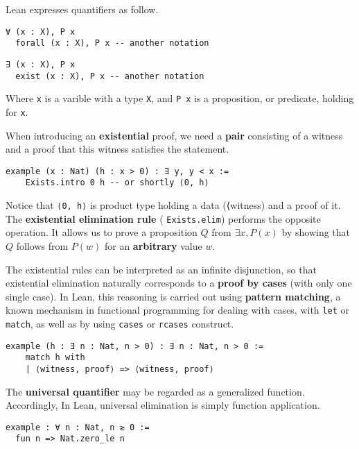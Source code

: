 \begin{example}
  Lean expresses quantifiers as follow.
  \begin{lstlisting}[language=lean, caption=For All]
  ∀ (x : X), P x
  forall (x : X), P x -- another notation
  \end{lstlisting}
  \begin{lstlisting}[language=lean, caption=Exists]
  ∃ (x : X), P x
  exist (x : X), P x -- another notation
  \end{lstlisting}
  Where \lstinline[language=lean]|x| is a varible with a type \lstinline[language=lean]|X|,
  and \lstinline[language=lean]|P x| is a proposition, or predicate, holding for \lstinline[language=lean]|x|.
\end{example}

\begin{example}
  When introducing an \textbf{existential} proof, 
  we need a \textbf{pair} consisting 
  of a witness and a proof that this witness 
  satisfies the statement.
  \begin{lstlisting}[language=lean]
  example (x : Nat) (h : x > 0) : ∃ y, y < x :=
    Exists.intro 0 h -- or shortly ⟨0, h⟩
\end{lstlisting}
\end{example}
Notice that \lstinline[language=lean]|⟨0, h⟩| is product type holding a data (⟨witness) 
and a proof of it.
The \textbf{existential elimination rule} 
( \lstinline[language=lean]|Exists.elim|) performs the opposite operation. 
It allows us to prove a proposition $Q$ 
from $\exists x, P(x)$ by showing 
that $Q$  follows from $P(w)$  for an \textbf{arbitrary} 
value $w$.
\begin{example}
  The existential rules can be interpreted as an infinite 
  disjunction, 
  so that existential elimination naturally corresponds to a \textbf{proof by cases} 
  (with only one single case). 
  In Lean, this reasoning is carried out using \textbf{pattern matching}, 
  a known mechanism in functional programming for dealing with cases,  
  with \lstinline[language=lean]|let| or \lstinline[language=lean]|match|, 
  as well as by using \lstinline[language=lean]|cases| or 
  \lstinline[language=lean]|rcases| construct. 
  \begin{lstlisting}[language=lean]
  example (h : ∃ n : Nat, n > 0) : ∃ n : Nat, n > 0 :=
    match h with
    | ⟨witness, proof⟩ => ⟨witness, proof⟩
  \end{lstlisting}
\end{example}
\begin{example}
The \textbf{universal quantifier} may be regarded as a generalized function.
Accordingly, In Lean, universal elimination is simply function application.
\begin{lstlisting}[language=lean]
example : ∀ n : Nat, n ≥ 0 :=
  fun n => Nat.zero_le n
\end{lstlisting}
\end{example}
